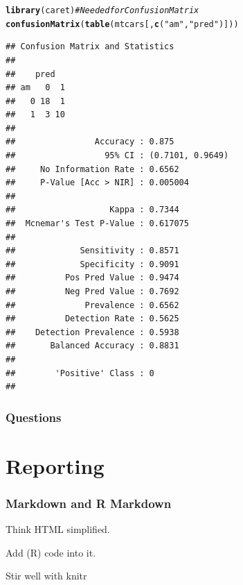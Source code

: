 \documentclass{beamer}\usepackage[]{graphicx}\usepackage[]{color}
\makeatletter
\newcommand{\hlstr}[1]{\textcolor[rgb]{0.192,0.494,0.8}{#1}}%
\newcommand{\hlcom}[1]{\textcolor[rgb]{0.678,0.584,0.686}{\textit{#1}}}%
\newcommand{\hlstd}[1]{\textcolor[rgb]{0.345,0.345,0.345}{#1}}%
\newcommand{\hlkwd}[1]{\textcolor[rgb]{0.737,0.353,0.396}{\textbf{#1}}}%
\newenvironment{kframe}{%
 \def\at@end@of@kframe{}%
 \ifinner\ifhmode%
  \def\at@end@of@kframe{\end{minipage}}%
  \begin{minipage}{\columnwidth}%
 \fi\fi%
 \def\FrameCommand##1{\hskip\@totalleftmargin \hskip-\fboxsep
 \colorbox{shadecolor}{##1}\hskip-\fboxsep
     \hskip-\linewidth \hskip-\@totalleftmargin \hskip\columnwidth}%
 \MakeFramed {\advance\hsize-\width
   \@totalleftmargin\z@ \linewidth\hsize
   \@setminipage}}%
 {\par\unskip\endMakeFramed%
 \at@end@of@kframe}
\newenvironment{knitrout}{}{} %
\makeatother
\begin{document}
\begin{frame}
\begin{knitrout}\tiny
{}\color{fgcolor}\begin{kframe}
\begin{alltt}
\hlkwd{library}\hlstd{(caret)}  \hlcom{# Needed for Confusion Matrix}
\hlkwd{confusionMatrix}\hlstd{(}\hlkwd{table}\hlstd{(mtcars[,} \hlkwd{c}\hlstd{(}\hlstr{"am"}\hlstd{,} \hlstr{"pred"}\hlstd{)]))}
\end{alltt}
\begin{verbatim}
## Confusion Matrix and Statistics
## 
##    pred
## am   0  1
##   0 18  1
##   1  3 10
##                                           
##                Accuracy : 0.875           
##                  95% CI : (0.7101, 0.9649)
##     No Information Rate : 0.6562          
##     P-Value [Acc > NIR] : 0.005004        
##                                           
##                   Kappa : 0.7344          
##  Mcnemar's Test P-Value : 0.617075        
##                                           
##             Sensitivity : 0.8571          
##             Specificity : 0.9091          
##          Pos Pred Value : 0.9474          
##          Neg Pred Value : 0.7692          
##              Prevalence : 0.6562          
##          Detection Rate : 0.5625          
##    Detection Prevalence : 0.5938          
##       Balanced Accuracy : 0.8831          
##                                           
##        'Positive' Class : 0               
## 
\end{verbatim}
\end{kframe}
\end{knitrout}

\end{frame}



\begin{frame}
	\frametitle{Questions}
	\begin{center}
		\vfill
		\vfill
	\end{center}
\end{frame}

\section{Reporting}

\begin{frame}
\frametitle{Markdown and R Markdown}

Think HTML simplified. \vfill

Add (R) code into it. \vfill

Stir well with knitr \vfill

\end{frame}
\end{document}
